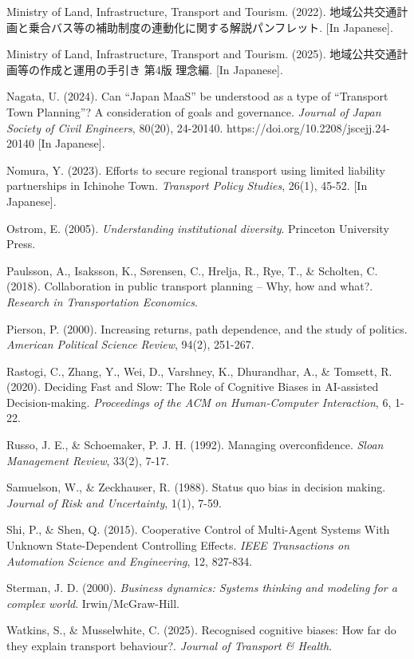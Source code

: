 Ministry of Land, Infrastructure, Transport and Tourism. (2022). 地域公共交通計画と乗合バス等の補助制度の連動化に関する解説パンフレット. {[}In Japanese{]}.

Ministry of Land, Infrastructure, Transport and Tourism. (2025). 地域公共交通計画等の作成と運用の手引き 第4版 理念編. {[}In Japanese{]}.

Nagata, U. (2024). Can ``Japan MaaS'' be understood as a type of ``Transport Town Planning''? A consideration of goals and governance. \emph{Journal of Japan Society of Civil Engineers}, 80(20), 24-20140. https://doi.org/10.2208/jscejj.24-20140 {[}In Japanese{]}.

Nomura, Y. (2023). Efforts to secure regional transport using limited liability partnerships in Ichinohe Town. \emph{Transport Policy Studies}, 26(1), 45-52. {[}In Japanese{]}.

Ostrom, E. (2005). \emph{Understanding institutional diversity}. Princeton University Press.

Paulsson, A., Isaksson, K., Sørensen, C., Hrelja, R., Rye, T., \& Scholten, C. (2018). Collaboration in public transport planning -- Why, how and what?. \emph{Research in Transportation Economics}.

Pierson, P. (2000). Increasing returns, path dependence, and the study of politics. \emph{American Political Science Review}, 94(2), 251-267.

Rastogi, C., Zhang, Y., Wei, D., Varshney, K., Dhurandhar, A., \& Tomsett, R. (2020). Deciding Fast and Slow: The Role of Cognitive Biases in AI-assisted Decision-making. \emph{Proceedings of the ACM on Human-Computer Interaction}, 6, 1-22.

Russo, J. E., \& Schoemaker, P. J. H. (1992). Managing overconfidence. \emph{Sloan Management Review}, 33(2), 7-17.

Samuelson, W., \& Zeckhauser, R. (1988). Status quo bias in decision making. \emph{Journal of Risk and Uncertainty}, 1(1), 7-59.

Shi, P., \& Shen, Q. (2015). Cooperative Control of Multi-Agent Systems With Unknown State-Dependent Controlling Effects. \emph{IEEE Transactions on Automation Science and Engineering}, 12, 827-834.

Sterman, J. D. (2000). \emph{Business dynamics: Systems thinking and modeling for a complex world}. Irwin/McGraw-Hill.

Watkins, S., \& Musselwhite, C. (2025). Recognised cognitive biases: How far do they explain transport behaviour?. \emph{Journal of Transport \& Health}.

